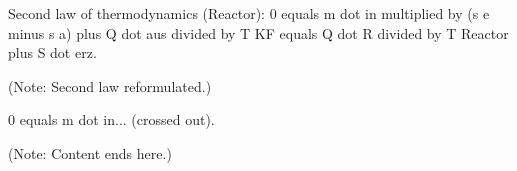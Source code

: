 Second law of thermodynamics (Reactor):  
0 equals m dot in multiplied by (s e minus s a) plus Q dot aus divided by T KF equals Q dot R divided by T Reactor plus S dot erz.  

(Note: Second law reformulated.)  

0 equals m dot in... (crossed out).  

(Note: Content ends here.)
